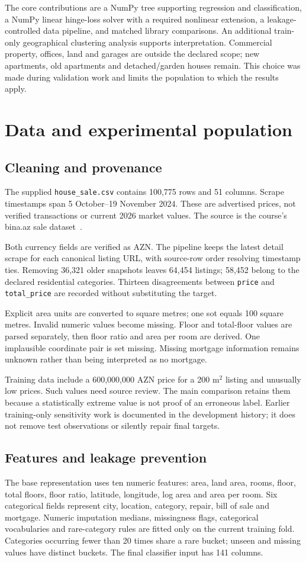 \documentclass[10pt,twocolumn,a4paper]{article}
\begin{document}
The core contributions are a NumPy tree supporting regression and classification, a NumPy linear hinge-loss solver with a required nonlinear extension, a leakage-controlled data pipeline, and matched library comparisons. An additional train-only geographical clustering analysis supports interpretation. Commercial property, offices, land and garages are outside the declared scope; new apartments, old apartments and detached/garden houses remain. This choice was made during validation work and limits the population to which the results apply.

\section{Data and experimental population}
\subsection{Cleaning and provenance}
The supplied \texttt{house\_sale.csv} contains 100,775 rows and 51 columns. Scrape timestamps span 5 October--19 November 2024. These are advertised prices, not verified transactions or current 2026 market values. The source is the course's bina.az sale dataset~\cite{data}.

Both currency fields are verified as AZN. The pipeline keeps the latest detail scrape for each canonical listing URL, with source-row order resolving timestamp ties. Removing 36,321 older snapshots leaves 64,454 listings; 58,452 belong to the declared residential categories. Thirteen disagreements between \texttt{price} and \texttt{total\_price} are recorded without substituting the target.

Explicit area units are converted to square metres; one sot equals 100 square metres. Invalid numeric values become missing. Floor and total-floor values are parsed separately, then floor ratio and area per room are derived. One implausible coordinate pair is set missing. Missing mortgage information remains unknown rather than being interpreted as no mortgage.

Training data include a 600,000,000 AZN price for a 200 m$^2$ listing and unusually low prices. Such values need source review. The main comparison retains them because a statistically extreme value is not proof of an erroneous label. Earlier training-only sensitivity work is documented in the development history; it does not remove test observations or silently repair final targets.

\subsection{Features and leakage prevention}
The base representation uses ten numeric features: area, land area, rooms, floor, total floors, floor ratio, latitude, longitude, log area and area per room. Six categorical fields represent city, location, category, repair, bill of sale and mortgage. Numeric imputation medians, missingness flags, categorical vocabularies and rare-category rules are fitted only on the current training fold. Categories occurring fewer than 20 times share a rare bucket; unseen and missing values have distinct buckets. The final classifier input has 141 columns.
\end{document}
